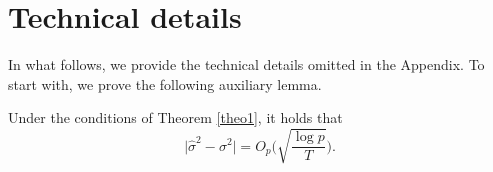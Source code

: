 \documentclass[a4paper,12pt]{article}
\numberwithin{equation}{section}
\begin{document}
\newpage
{}
\vspace{-0.25cm}

\vspace{-0.25cm}



\def\thesection{S.\arabic{section}}
\setcounter{section}{0}
\def\theequation{S.\arabic{equation}}
\setcounter{equation}{0}
\def\thefigure{S.\arabic{figure}}
\setcounter{figure}{0}
\def\thetable{S.\arabic{table}}
\setcounter{table}{0}
\renewcommand{\baselinestretch}{1.2}\normalsize



\section{Technical details}


In what follows, we provide the technical details omitted in the Appendix. To start with, we prove the following auxiliary lemma.
\begin{lemmaS}\label{lemmaS1}
Under the conditions of Theorem \ref{theo1}, it holds that 
\[ \big| \hat{\sigma}^2 - \sigma^2 \big| = O_p\Big( \sqrt{\frac{\log p}{T}} \Big). \]
\end{lemmaS} 
\end{document}
